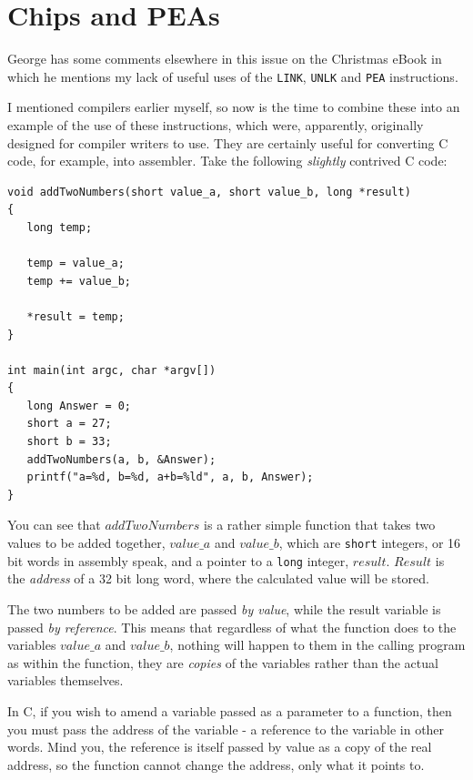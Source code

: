 \chapter{Chips and PEAs}

George has some comments elsewhere in this issue on the Christmas eBook in which he mentions my lack of useful uses of the \texttt{LINK}, \texttt{UNLK} and \texttt{PEA} instructions. 

I mentioned compilers earlier myself, so now is the time to combine these into an example of the use of these instructions, which were, apparently, originally designed for compiler writers to use. They are certainly useful for converting C code, for example, into assembler. Take the following \emph{slightly} contrived C code:

\begin{lstlisting}[firstnumber=1,caption={Contrived C Code}]
void addTwoNumbers(short value_a, short value_b, long *result) 
{
   long temp;
   
   temp = value_a;
   temp += value_b;
   
   *result = temp;
}

int main(int argc, char *argv[])
{
   long Answer = 0;
   short a = 27;
   short b = 33;
   addTwoNumbers(a, b, &Answer);
   printf("a=%d, b=%d, a+b=%ld", a, b, Answer);
}
\end{lstlisting}

You can see that $addTwoNumbers$ is a rather simple function that takes two values to be added together, $value\_a$ and $value\_b$, which are \texttt{short} integers, or 16 bit words in assembly speak, and a pointer to a \texttt{long} integer, $result$. $Result$ is the \emph{address} of a 32 bit long word, where the calculated value will be stored.

The two numbers to be added are passed \emph{by value}, while the result variable is passed \emph{by reference}. This means that regardless of what the function does to the variables $value\_a$ and $value\_b$, nothing will happen to them in the calling program as within the function, they are \emph{copies} of the variables rather than the actual variables themselves.

In C, if you wish to amend a variable passed as a parameter to a function, then you must pass the address of the variable - a reference to the variable in other words. Mind you, the reference is itself passed by value as a copy of the real address, so the function cannot change the address, only what it points to.

